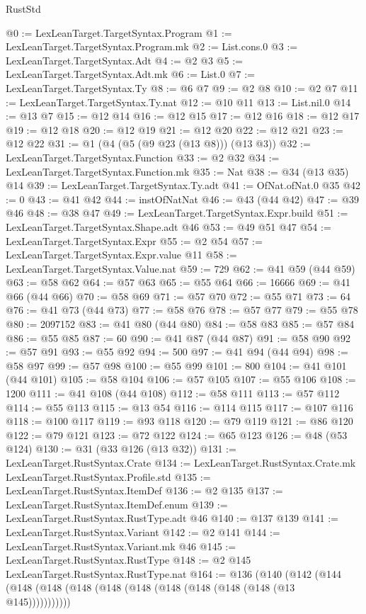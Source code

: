 \begin{lexlean}{RustStd}
\begin{coremodule}
@0 := LexLeanTarget.TargetSyntax.Program
@1 := LexLeanTarget.TargetSyntax.Program.mk
@2 := List.cons.{0}
@3 := LexLeanTarget.TargetSyntax.Adt
@4 := @2 @3
@5 := LexLeanTarget.TargetSyntax.Adt.mk
@6 := List.{0}
@7 := LexLeanTarget.TargetSyntax.Ty
@8 := @6 @7
@9 := @2 @8
@10 := @2 @7
@11 := LexLeanTarget.TargetSyntax.Ty.nat
@12 := @10 @11
@13 := List.nil.{0}
@14 := @13 @7
@15 := @12 @14
@16 := @12 @15
@17 := @12 @16
@18 := @12 @17
@19 := @12 @18
@20 := @12 @19
@21 := @12 @20
@22 := @12 @21
@23 := @12 @22
@31 := @1 (@4 (@5 (@9 @23 (@13 @8))) (@13 @3))
@32 := LexLeanTarget.TargetSyntax.Function
@33 := @2 @32
@34 := LexLeanTarget.TargetSyntax.Function.mk
@35 := Nat
@38 := @34 (@13 @35) @14
@39 := LexLeanTarget.TargetSyntax.Ty.adt
@41 := OfNat.ofNat.{0} @35
@42 := 0
@43 := @41 @42
@44 := instOfNatNat
@46 := @43 (@44 @42)
@47 := @39 @46
@48 := @38 @47
@49 := LexLeanTarget.TargetSyntax.Expr.build
@51 := LexLeanTarget.TargetSyntax.Shape.adt @46
@53 := @49 @51 @47
@54 := LexLeanTarget.TargetSyntax.Expr
@55 := @2 @54
@57 := LexLeanTarget.TargetSyntax.Expr.value @11
@58 := LexLeanTarget.TargetSyntax.Value.nat
@59 := 729
@62 := @41 @59 (@44 @59)
@63 := @58 @62
@64 := @57 @63
@65 := @55 @64
@66 := 16666
@69 := @41 @66 (@44 @66)
@70 := @58 @69
@71 := @57 @70
@72 := @55 @71
@73 := 64
@76 := @41 @73 (@44 @73)
@77 := @58 @76
@78 := @57 @77
@79 := @55 @78
@80 := 2097152
@83 := @41 @80 (@44 @80)
@84 := @58 @83
@85 := @57 @84
@86 := @55 @85
@87 := 60
@90 := @41 @87 (@44 @87)
@91 := @58 @90
@92 := @57 @91
@93 := @55 @92
@94 := 500
@97 := @41 @94 (@44 @94)
@98 := @58 @97
@99 := @57 @98
@100 := @55 @99
@101 := 800
@104 := @41 @101 (@44 @101)
@105 := @58 @104
@106 := @57 @105
@107 := @55 @106
@108 := 1200
@111 := @41 @108 (@44 @108)
@112 := @58 @111
@113 := @57 @112
@114 := @55 @113
@115 := @13 @54
@116 := @114 @115
@117 := @107 @116
@118 := @100 @117
@119 := @93 @118
@120 := @79 @119
@121 := @86 @120
@122 := @79 @121
@123 := @72 @122
@124 := @65 @123
@126 := @48 (@53 @124)
@130 := @31 (@33 @126 (@13 @32))
@131 := LexLeanTarget.RustSyntax.Crate
@134 := LexLeanTarget.RustSyntax.Crate.mk LexLeanTarget.RustSyntax.Profile.std
@135 := LexLeanTarget.RustSyntax.ItemDef
@136 := @2 @135
@137 := LexLeanTarget.RustSyntax.ItemDef.enum
@139 := LexLeanTarget.RustSyntax.RustType.adt @46
@140 := @137 @139
@141 := LexLeanTarget.RustSyntax.Variant
@142 := @2 @141
@144 := LexLeanTarget.RustSyntax.Variant.mk @46
@145 := LexLeanTarget.RustSyntax.RustType
@148 := @2 @145 LexLeanTarget.RustSyntax.RustType.nat
@164 := @136
    (@140
      (@142
        (@144 (@148 (@148 (@148 (@148 (@148 (@148 (@148 (@148 (@148 (@13 @145)))))))))))

\end{coremodule}
\end{lexlean}
